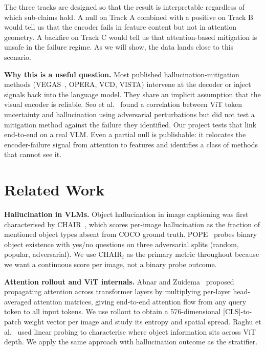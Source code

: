 \documentclass[11pt]{article}
\begin{document}
The three tracks are designed so that the result is interpretable regardless of which
sub-claims hold. A null on Track A combined with a positive on Track B would tell us
that the encoder fails in feature content but not in attention geometry. A backfire on
Track C would tell us that attention-based mitigation is unsafe in the failure regime.
As we will show, the data lands close to this scenario.

\textbf{Why this is a useful question.} Most published hallucination-mitigation methods
(VEGAS~\cite{seo2024vegas}, OPERA, VCD, VISTA) intervene at the decoder or inject
signals back into the language model. They share an implicit assumption that the visual
encoder is reliable. Seo et al.~\cite{seo2025vit} found a correlation between ViT token
uncertainty and hallucination using adversarial perturbations but did not test a
mitigation method against the failure they identified. Our project tests that link
end-to-end on a real VLM. Even a partial null is publishable: it relocates the
encoder-failure signal from attention to features and identifies a class of methods that
cannot see it.

\section{Related Work}

\textbf{Hallucination in VLMs.} Object hallucination in image captioning was first
characterised by CHAIR~\cite{rohrbach2018chair}, which scores per-image hallucination
as the fraction of mentioned object types absent from COCO ground truth.
POPE~\cite{li2023pope} probes binary object existence with yes/no questions on three
adversarial splits (random, popular, adversarial). We use $\mathrm{CHAIR}_i$ as the
primary metric throughout because we want a continuous score per image, not a binary
probe outcome.

\textbf{Attention rollout and ViT internals.} Abnar and Zuidema~\cite{abnar2020rollout}
proposed propagating attention across transformer layers by multiplying per-layer
head-averaged attention matrices, giving end-to-end attention flow from any query token
to all input tokens. We use rollout to obtain a 576-dimensional [CLS]-to-patch weight
vector per image and study its entropy and spatial spread.
Raghu et al.~\cite{raghu2021vit} used linear probing to characterise where object
information sits across ViT depth. We apply the same approach with hallucination
outcome as the stratifier.
\end{document}
